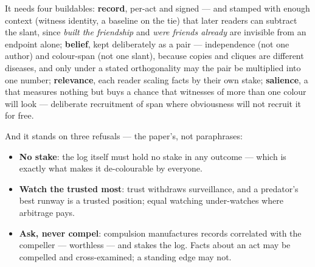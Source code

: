 \documentclass[../main_explainer]{subfiles}
\begin{document}


It needs four buildables: \textbf{record}, per-act and signed --- and stamped with
enough context (witness identity, a baseline on the tie) that later readers can subtract
the slant, since \emph{built the friendship} and \emph{were friends already} are
invisible from an endpoint alone; \textbf{belief}, kept deliberately as a pair ---
independence (not one author) and colour-span (not one slant), because copies and
cliques are different diseases, and only under a stated orthogonality may the pair be
multiplied into one number; \textbf{relevance}, each reader scaling facts by their own
stake; \textbf{salience}, a  that measures nothing but buys a chance that witnesses of
more than one colour will look --- deliberate recruitment of span where obviousness will
not recruit it for free.

And it stands on three refusals --- the paper's, not paraphrases:

\begin{itemize}[leftmargin=*]
\item \textbf{No stake}: the log itself must hold no stake in any outcome --- which is
  exactly what makes it de-colourable by everyone.
\item \textbf{Watch the trusted most}: trust withdraws surveillance, and a predator's
  best runway is a trusted position; equal watching under-watches where arbitrage pays.
\item \textbf{Ask, never compel}: compulsion manufactures records correlated with the
  compeller --- worthless --- and stakes the log. Facts about an act may be compelled
  and cross-examined; a standing edge may not.
\end{itemize}
\end{document}
